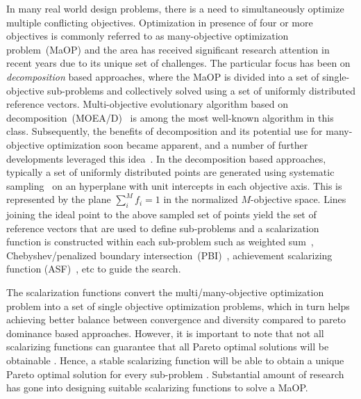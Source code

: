 \documentclass{sig-alternate}
\begin{document}
In many real world design problems, there is a need to simultaneously optimize multiple conflicting objectives. Optimization in presence of four or more objectives is commonly referred to as many-objective optimization problem~(MaOP) and the area has received significant research attention in recent years due to its unique set of challenges. The particular focus has been on \emph{decomposition} based approaches, where the MaOP is divided into a set of single-objective sub-problems and collectively solved using a set of uniformly distributed reference vectors. Multi-objective evolutionary algorithm based on decomposition~(MOEA/D)~\cite{zhang2007moead} is among the most well-known algorithm in this class. Subsequently, the benefits of decomposition and its potential use for many-objective optimization soon became apparent, and a number of further developments leveraged this idea~\cite{trivedisurvey}. In the decomposition based approaches, typically a set of uniformly distributed points are generated using systematic sampling~\cite{das1998normal} on an hyperplane with unit intercepts in each objective axis. This is represented by the plane $\sum^{M}_i{f_i}=1$ in the normalized $M$-objective space. Lines joining the ideal point to the above sampled set of points yield the set of reference vectors that are used to define sub-problems and a scalarization function is constructed within each sub-problem such as weighted sum~\cite{miettinen2012nonlinear, Voss2008}, Chebyshev/penalized boundary intersection~(PBI)~\cite{zhang2007moead}, achievement scalarizing function (ASF)~\cite{miettinen2012nonlinear, Yuan2016many}, etc to guide the search.

The scalarization functions convert the multi/many-objective optimization problem into a set of single objective optimization problems, which in turn helps achieving better balance between convergence and diversity compared to pareto dominance based approaches. However, it is important to note that not all scalarizing functions can guarantee that all Pareto optimal solutions will be obtainable \cite{miettinen2012nonlinear}. Hence, a stable scalarizing function will be able to obtain a unique Pareto optimal solution for every sub-problem \cite{giakiozis2015}. Substantial amount of research has gone into designing suitable scalarizing functions to solve a MaOP. 
\end{document}
